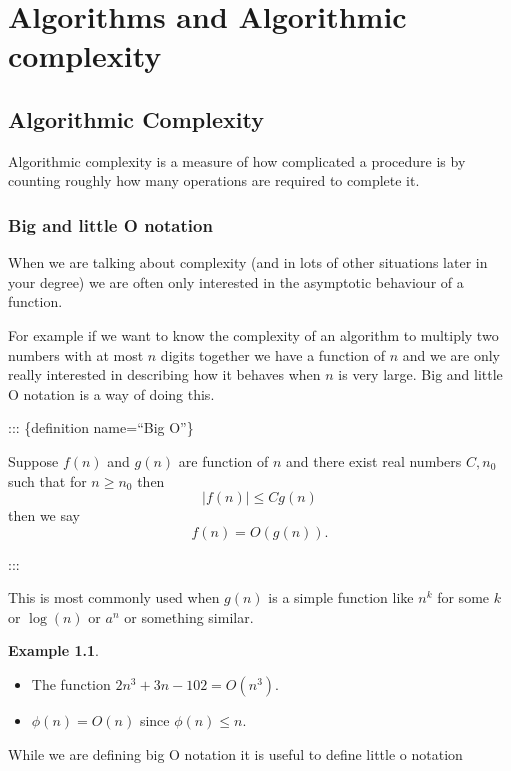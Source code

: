 \documentclass[
]{book}
\theoremstyle{definition}
\theoremstyle{definition}
\newtheorem{example}{Example}[chapter]
\theoremstyle{definition}
\theoremstyle{definition}
\theoremstyle{remark}
\begin{document}
\chapter{Algorithms and Algorithmic complexity}\label{algorithms-and-algorithmic-complexity}

\section{Algorithmic Complexity}\label{algorithmic-complexity}

Algorithmic complexity is a measure of how complicated a procedure is by counting roughly how many operations are required to complete it.

\subsection{Big and little O notation}\label{big-and-little-o-notation}

When we are talking about complexity (and in lots of other situations later in your degree) we are often only interested in the asymptotic behaviour of a function.

For example if we want to know the complexity of an algorithm to multiply two numbers with at most \(n\) digits together we have a function of \(n\) and we are only really interested in describing how it behaves when \(n\) is very large. Big and little O notation is a way of doing this.

::: \{definition name=``Big O''\}

Suppose \(f(n)\) and \(g(n)\) are function of \(n\) and there exist real numbers \(C, n_0\) such that for \(n \geq n_0\) then
\[|f(n)| \leq C g(n)\] then we say
\[ f(n) = O(g(n)).  \]

:::

This is most commonly used when \(g(n)\) is a simple function like \(n^k\) for some \(k\) or \(\log(n)\) or \(a^n\) or something similar.

\begin{example}

\begin{itemize}
\item
  The function \(2n^3 + 3n - 102 = O(n^3)\).
\item
  \(\phi(n) = O(n)\) since \(\phi(n) \leq n\).
\end{itemize}

\end{example}

While we are defining big O notation it is useful to define little o notation
\end{document}
